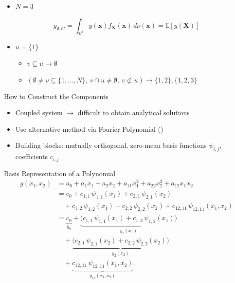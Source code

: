 \begin{frame}
    \begin{itemize}
    \item $N = 3$
  \end{itemize}
    \begin{equation*}
    y_{\emptyset,G} = \int_{\mathbb{R}^3} y(\boldsymbol{x}) f_{\boldsymbol{X}}(\boldsymbol{x}) \, d \nu(\boldsymbol{x}) = \mathbb{E}[y(\boldsymbol{X})]
    \end{equation*}
    \begin{itemize}
      \item $u = \{1\}$
      \begin{itemize}
        \item $v \subsetneq u \rightarrow \emptyset$
        \item $(\emptyset \ne v \subseteq \{1,\dots,N\},\ v \cap u \ne \emptyset,\ v \not\subset u) \rightarrow \{1,2\}, \{1,2,3\}$
      \end{itemize}
    \end{itemize}

\end{frame}

\begin{frame}{How to Construct the Components}
    \begin{itemize}
        \item Coupled system $\rightarrow$ difficult to obtain analytical solutions
        \item Use alternative method via Fourier Polynomial (\cite{rahman2014})
        \item Building blocks: mutually orthogonal, zero-mean basis functions $\psi_{i, j}$, coefficients $c_{i, j}$
    \end{itemize}
\end{frame}

\begin{frame}{Basis Representation of a Polynomial}
    \begin{align*}
y(x_1,x_2) 
&= a_0 + a_1 x_1 + a_2 x_2 
   + a_{11} x_1^2 + a_{22} x_2^2 + a_{12} x_1 x_2 \\[0.5em]
&= c_0 
   + c_{1,1}\,\psi_{1,1}(x_1) 
   + c_{2,1}\,\psi_{2,1}(x_2) \\[0.5em]
&\quad
   + c_{1,2}\,\psi_{1,2}(x_1)
   + c_{2,2}\,\psi_{2,2}(x_2)
   + c_{12,11}\,\psi_{12,11}(x_1,x_2) \\[0.5em]
&= 
   \underbrace{c_0}_{y_0}
   + \underbrace{\big(c_{1,1}\,\psi_{1,1}(x_1) 
                     + c_{1,2}\,\psi_{1,2}(x_1)\big)}_{y_1(x_1)} \\[0.5em]
&\quad
   + \underbrace{\big(c_{2,1}\,\psi_{2,1}(x_2) 
                     + c_{2,2}\,\psi_{2,2}(x_2)\big)}_{y_2(x_2)} \\[0.5em]
&\quad
   + \underbrace{c_{12,11}\,\psi_{12,11}(x_1,x_2)}_{y_{12}(x_1,x_2)}.
\end{align*}
\end{frame}

